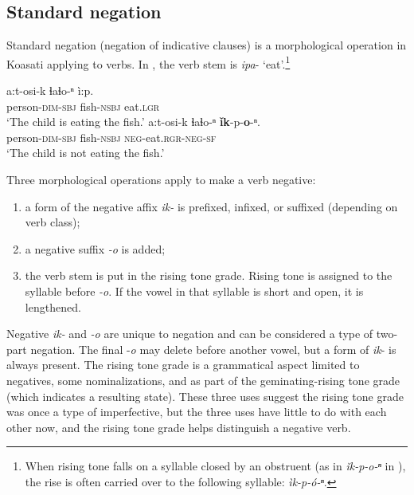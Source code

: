 \documentclass[output=paper,colorlinks,citecolor=brown]{langscibook}
\begin{document}
\subsection{Standard negation}\label{sec:koa:2.1}

Standard negation (negation of indicative clauses) is a morphological operation in Koasati applying to verbs. In , the verb stem is \textit{ipa}- ‘eat’.\footnote{When rising tone falls on a syllable closed by an obstruent (as in \textit{ǐk-p-o-ⁿ} in ), the rise is often carried over to the following syllable: \textit{ìk-p-ó-ⁿ}.}


\ea\label{ex:koa:10}
    \ea\label{ex:koa:10a}
        \gll a:t-osi-k  ɬaɬo-ⁿ  ì:p. \\ 
             person-\textsc{dim}-\textsc{sbj}  fish-\textsc{nsbj}  eat.\textsc{lgr} \\
        \glt ‘The child is eating the fish.’
    \ex\label{ex:koa:10b}
        \gll a:t-osi-k  ɬaɬo-ⁿ \textbf{ǐk}-p-\textbf{o}-ⁿ.\\
             person-\textsc{dim}-\textsc{sbj}  fish-\textsc{nsbj}  \textsc{neg}-eat.\textsc{rgr}-\textsc{neg}-\textsc{sf}\\
        \glt ‘The child is not eating the fish.’
    \z
\z

Three morphological operations apply to make a verb negative:

\begin{enumerate}
    \item a form of the negative affix \textit{ik-} is prefixed, infixed, or suffixed (depending on verb class);
    \item a negative suffix \textit{-o} is added;
    \item the verb stem is put in the rising tone grade. Rising tone is assigned to the syllable before \textit{-o}. If the vowel in that syllable is short and open, it is lengthened.
\end{enumerate}

Negative \textit{ik-} and \textit{-o} are unique to negation and can be considered a type of two-part negation. The final -\textit{o} may delete before another vowel, but a form of \textit{ik}- is always present. The rising tone grade is a grammatical aspect limited to negatives, some nominalizations, and as part of the geminating-rising tone grade (which indicates a resulting state). These three uses suggest the rising tone grade was once a type of imperfective, but the three uses have little to do with each other now, and the rising tone grade helps distinguish a negative verb.
\end{document}
